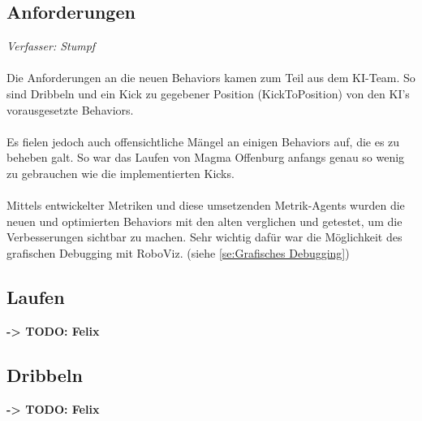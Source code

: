 \documentclass[fontsize=12pt,a4paper,final]{scrartcl}[2003/01/01]
\begin{document}
\subsection{Anforderungen}
\textit{Verfasser: Stumpf}\\
\\
Die Anforderungen an die neuen Behaviors kamen zum Teil aus dem KI-Team. So sind Dribbeln und ein Kick zu gegebener Position (KickToPosition) von den KI's vorausgesetzte Behaviors.\\
\\
Es fielen jedoch auch offensichtliche Mängel an einigen Behaviors auf, die es zu beheben galt. So war das Laufen von Magma Offenburg anfangs genau so wenig zu gebrauchen wie die implementierten Kicks.\\
\\
Mittels entwickelter Metriken und diese umsetzenden Metrik-Agents wurden die neuen und optimierten Behaviors mit den alten verglichen und getestet, um die Verbesserungen sichtbar zu machen. Sehr wichtig dafür war die Möglichkeit des grafischen Debugging mit RoboViz. (siehe \autoref{se:Grafisches Debugging})

\subsection{Laufen}\label{sse:Elem Bew:Laufen}
\textbf{-> TODO: Felix}
\subsection{Dribbeln}\label{sse:Elem Bew:Dribbeln}
\textbf{-> TODO: Felix}
\end{document}
